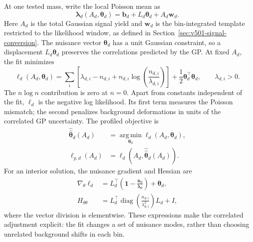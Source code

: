 At one tested mass, write the local Poisson mean as
\begin{equation}
 \bm\lambda_d(A_d,\bm\theta_d)
 =\bm b_d+L_d\bm\theta_d+A_d\bm w_d.
 \label{eq:v501-profile-mean}
\end{equation}
Here $A_d$ is the total Gaussian signal yield and $\bm w_d$ is the
bin-integrated template restricted to the likelihood window, as defined in
Section~\ref{sec:v501-signal-conversion}. The nuisance vector $\bm\theta_d$
has a unit Gaussian constraint, so a displacement $L_d\bm\theta_d$ preserves
the correlations predicted by the GP. At fixed $A_d$, the fit minimizes
\begin{equation}
 \ell_d(A_d,\bm\theta_d)=
 \sum_i\left[\lambda_{d,i}-n_{d,i}
 +n_{d,i}\log\!\left(\frac{n_{d,i}}{\lambda_{d,i}}\right)\right]
 +\frac12\bm\theta_d^\top\bm\theta_d,
 \qquad \lambda_{d,i}>0.
 \label{v5-eq:profile-objective}
\end{equation}
The $n\log n$ contribution is zero at $n=0$. Apart from constants independent
of the fit, $\ell_d$ is the negative log likelihood. Its first term measures
the Poisson mismatch; the second penalizes background deformations in units
of the correlated GP uncertainty. The profiled objective is
\begin{align}
 \widehat{\widehat{\bm\theta}}_d(A_d)
 &=\operatorname*{arg\,min}_{\bm\theta_d}\ell_d(A_d,\bm\theta_d),\\
 \ell_{p,d}(A_d)
 &=\ell_d\!\left(A_d,\widehat{\widehat{\bm\theta}}_d(A_d)\right).
 \label{eq:v501-profile-definition}
\end{align}
For an interior solution, the nuisance gradient and Hessian are
\begin{align}
 \nabla_{\theta}\ell_d
 &=L_d^\top\!\left(\bm1-\frac{\bm n_d}{\bm\lambda_d}\right)+\bm\theta_d,\\
 H_{\theta\theta}
 &=L_d^\top\operatorname{diag}\!\left(\frac{n_{d,i}}{\lambda_{d,i}^{2}}\right)L_d+I,
 \label{eq:v501-profile-curvature}
\end{align}
where the vector division is elementwise. These expressions make the
correlated adjustment explicit: the fit changes a set of nuisance modes,
rather than choosing unrelated background shifts in each bin.


